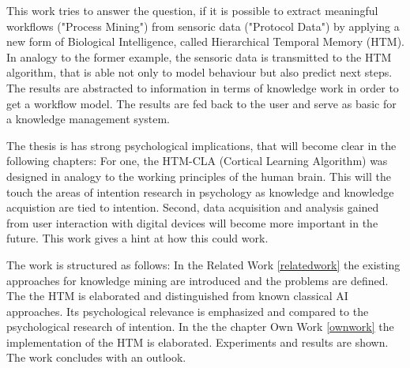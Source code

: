 This work tries to answer the question, if it is possible to extract meaningful workflows ("Process Mining") from sensoric data ("Protocol Data") by applying a new form of Biological Intelligence, called Hierarchical Temporal Memory (HTM). In analogy to the former example, the sensoric data is transmitted to the HTM algorithm, that is able not only to model behaviour but also predict next steps. The results are abstracted to information in terms of knowledge work in order to get a workflow model. The results are fed back to the user and serve as basic for a knowledge management system. 
 
 The thesis is has strong psychological implications, that will become clear in the following chapters: For one, the HTM-CLA (Cortical Learning Algorithm) was designed in analogy to the working principles of the human brain. This will the touch the areas of intention research in psychology as knowledge and knowledge acquistion are tied to intention. Second, data acquisition and analysis gained from user interaction with digital devices will become more important in the future. This work gives a hint at how this could work.
 
 The work is structured as follows: In the Related Work \ref{relatedwork} the existing approaches for knowledge mining are introduced and the problems are defined. The the HTM is elaborated and distinguished from known classical AI approaches. Its psychological relevance is emphasized and compared to the psychological research of intention. In the the chapter Own Work \ref{ownwork} the implementation of the HTM is elaborated. Experiments and results are shown. The work concludes with an outlook.
 
